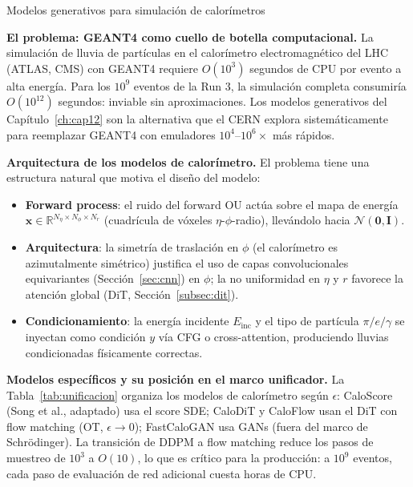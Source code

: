 \begin{estrella}{Modelos generativos para simulación de calorímetros}

\textbf{El problema: GEANT4 como cuello de botella computacional.}
La simulación de lluvia de partículas en el calorímetro electromagnético del
LHC (ATLAS, CMS) con GEANT4 requiere $O(10^3)$ segundos de CPU por evento a
alta energía. Para los $10^9$ eventos de la Run 3, la simulación completa
consumiría $O(10^{12})$ segundos: inviable sin aproximaciones. Los modelos
generativos del Capítulo~\ref{ch:cap12} son la alternativa que el CERN explora
sistemáticamente para reemplazar GEANT4 con emuladores $10^4$--$10^6\times$ más
rápidos.

\textbf{Arquitectura de los modelos de calorímetro.}
El problema tiene una estructura natural que motiva el diseño del modelo:
\begin{itemize}
  \item \textbf{Forward process}: el ruido del forward OU actúa sobre el mapa
        de energía $\bm{x}\in\mathbb{R}^{N_\eta\times N_\phi\times N_r}$ (cuadrícula
        de vóxeles $\eta$-$\phi$-radio), llevándolo hacia $\mathcal{N}(\bm{0},\bm{I})$.
  \item \textbf{Arquitectura}: la simetría de traslación en $\phi$ (el calorímetro
        es azimutalmente simétrico) justifica el uso de capas convolucionales
        equivariantes (Sección~\ref{sec:cnn}) en $\phi$; la no uniformidad en
        $\eta$ y $r$ favorece la atención global (DiT, Sección~\ref{subsec:dit}).
  \item \textbf{Condicionamiento}: la energía incidente $E_{\mathrm{inc}}$ y el
        tipo de partícula $\pi/e/\gamma$ se inyectan como condición $y$ vía CFG
        o cross-attention, produciendo lluvias condicionadas físicamente correctas.
\end{itemize}

\textbf{Modelos específicos y su posición en el marco unificador.}
La Tabla~\ref{tab:unificacion} organiza los modelos de calorímetro según $\epsilon$:
CaloScore (Song et al., adaptado) usa el score SDE; CaloDiT y CaloFlow usan el
DiT con flow matching (OT, $\epsilon\to 0$); FastCaloGAN usa GANs (fuera del
marco de Schrödinger). La transición de DDPM a flow matching reduce los pasos
de muestreo de $10^3$ a $O(10)$, lo que es crítico para la producción: a
$10^9$ eventos, cada paso de evaluación de red adicional cuesta horas de CPU.


\end{estrella}
